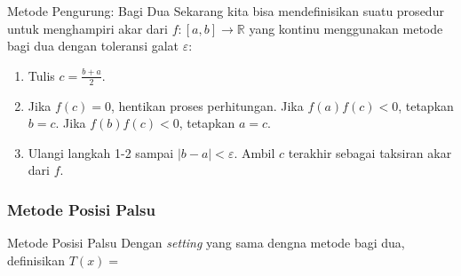 \documentclass[xcolor={dvipsnames}, 9pt]{beamer}
\begin{document}
	\begin{frame}{Metode Pengurung: Bagi Dua}
		Sekarang kita bisa mendefinisikan suatu prosedur untuk menghampiri akar dari $f:[a,b]\to\mathbb{R}$ yang kontinu menggunakan metode bagi dua dengan toleransi galat $\varepsilon$:
		\begin{enumerate}
			\item Tulis $c = \frac{b+a}{2}$.
			\item Jika $f(c) = 0$, hentikan proses perhitungan. \newline
			Jika $f(a)f(c) < 0$, tetapkan $b = c$. \newline
			Jika $f(b)f(c) < 0$, tetapkan $a = c$.
			\item Ulangi langkah 1-2 sampai $|b-a|<\varepsilon$. Ambil $c$ terakhir sebagai taksiran akar dari $f$.
		\end{enumerate}
	\end{frame}
	\subsubsection{Metode Posisi Palsu}
	\begin{frame}{Metode Posisi Palsu}
		Dengan \textit{setting} yang sama dengna metode bagi dua, definisikan $T(x) = $
	\end{frame}
\end{document}

